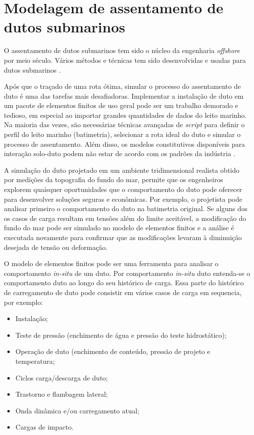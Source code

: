 \chapter{Modelagem de assentamento de dutos submarinos}
\label{chap:assentamento}

O assentamento de dutos submarinos tem sido o núcleo da engenharia \textit{offshore} por meio século. Vários métodos e técnicas tem sido desenvolvidas e usadas para dutos submarinos \cite[]{Ivic2016}.

Após que o traçado de uma rota ótima, simular o processo do assentamento de duto é uma das tarefas mais desafiadoras. Implementar a instalação de duto em um pacote de elementos finitos de uso geral pode ser um trabalho demorado e tedioso, em especial ao importar grandes quantidades de dados do leito marinho. Na maioria das vezes, são necessárias técnicas avançadas de \textit{script} para definir o perfil do leito marinho (batimetria), selecionar a rota ideal do duto e simular o processo de assentamento. Além disso, os modelos constitutivos disponíveis para interação solo-duto podem não estar de acordo com os padrões da indústria \cite[]{VandenAbeele2013}.

A simulação do duto projetado em um ambiente tridimensional realista obtido por medições da topografia do fundo do mar, permite que os engenheiros explorem quaisquer oportunidades que o comportamento do duto pode oferecer para desenvolver soluções seguras e econômicas. Por exemplo, o projetista pode analisar primeiro o comportamento do duto na batimetria original. Se alguns dos os casos de carga resultam em tensões além do limite aceitável, a modificação do fundo do mar pode ser simulado no modelo de elementos finitos e a análise é executada novamente para confirmar que as modificações levaram à diminuição desejada de tensão ou deformação.

O modelo de elementos finitos pode ser uma ferramenta para analisar o comportamento \textit{in-situ} de um duto. Por comportamento \textit{in-situ} duto entenda-se o comportamento duto ao longo do seu histórico de carga. Essa parte do histórico de carregamento de duto pode consistir em vários casos de carga em sequencia, por exemplo:

\begin{itemize}
    \item Instalação;
    \item Teste de pressão (enchimento de água e pressão do teste hidrostático);
    \item Operação de duto (enchimento de conteúdo, pressão de projeto e temperatura;
    \item Ciclos carga/descarga de duto;
    \item Trastorno e flambagem lateral;
    \item Onda dinâmica e/ou carregamento atual;
    \item Cargas de impacto.
\end{itemize}


